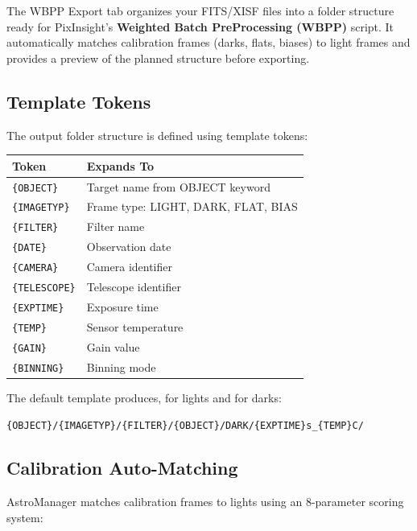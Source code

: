 \documentclass[11pt,a4paper]{article}
\begin{document}
The WBPP Export tab organizes your FITS/XISF files into a folder structure ready for PixInsight's \textbf{Weighted Batch PreProcessing (WBPP)} script. It automatically matches calibration frames (darks, flats, biases) to light frames and provides a preview of the planned structure before exporting.

\subsection{Template Tokens}

The output folder structure is defined using template tokens:

\begin{center}
\begin{tabular}{lp{8cm}}
\toprule
\textbf{Token} & \textbf{Expands To} \\
\midrule
\texttt{\{OBJECT\}} & Target name from OBJECT keyword \\
\texttt{\{IMAGETYP\}} & Frame type: LIGHT, DARK, FLAT, BIAS \\
\texttt{\{FILTER\}} & Filter name \\
\texttt{\{DATE\}} & Observation date \\
\texttt{\{CAMERA\}} & Camera identifier \\
\texttt{\{TELESCOPE\}} & Telescope identifier \\
\texttt{\{EXPTIME\}} & Exposure time \\
\texttt{\{TEMP\}} & Sensor temperature \\
\texttt{\{GAIN\}} & Gain value \\
\texttt{\{BINNING\}} & Binning mode \\
\bottomrule
\end{tabular}
\end{center}

The default template produces, for lights and for darks:
\begin{center}\texttt{\{OBJECT\}/\{IMAGETYP\}/\{FILTER\}/}\qquad \texttt{\{OBJECT\}/DARK/\{EXPTIME\}s\_\{TEMP\}C/}\end{center}

\subsection{Calibration Auto-Matching}

AstroManager matches calibration frames to lights using an 8-parameter scoring system:
\end{document}
